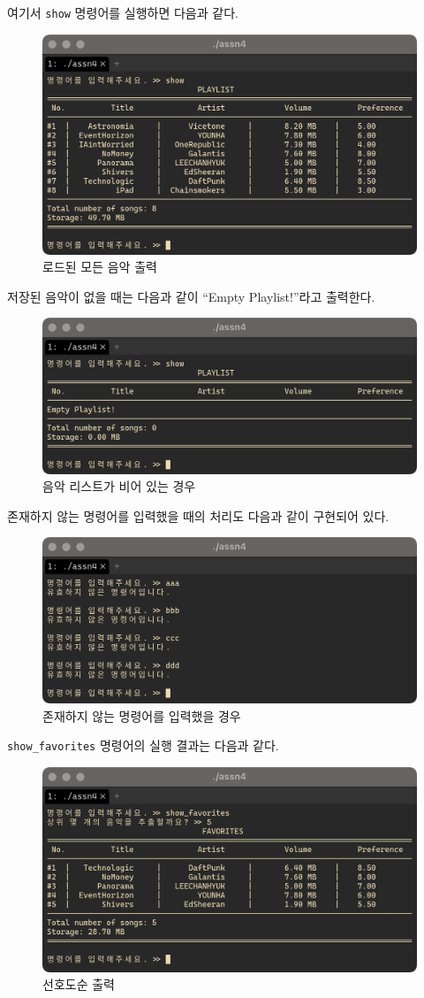 \documentclass[titlepage]{article}
\begin{document}
여기서 \texttt{show} 명령어를 실행하면 다음과 같다.

\begin{figure}[H]
  \centering
  \includegraphics[width=0.7\linewidth]{show.png}
  \caption{로드된 모든 음악 출력}
\end{figure}

저장된 음악이 없을 때는 다음과 같이 ``Empty Playlist!''라고 출력한다.

\begin{figure}[H]
  \centering
  \includegraphics[width=0.7\linewidth]{show_empty.png}
  \caption{음악 리스트가 비어 있는 경우}
\end{figure}

존재하지 않는 명령어를 입력했을 때의 처리도 다음과 같이 구현되어 있다.

\begin{figure}[H]
  \centering
  \includegraphics[width=0.7\linewidth]{cmd_validation.png}
  \caption{존재하지 않는 명령어를 입력했을 경우}
\end{figure}

\texttt{show\_favorites} 명령어의 실행 결과는 다음과 같다.

\begin{figure}[H]
  \centering
  \includegraphics[width=0.7\linewidth]{show_favorites.png}
  \caption{선호도순 출력}
\end{figure}
\end{document}
